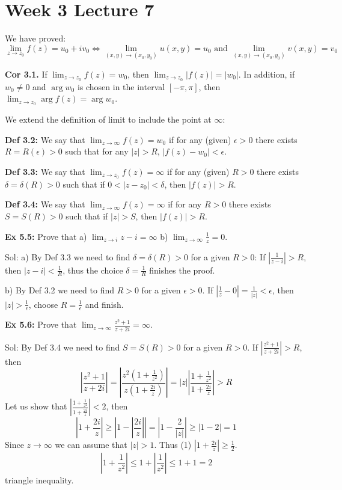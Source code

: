 \documentclass{article}
\begin{document}
\section*{Week 3 Lecture 7}
We have proved:
$$ \lim_{z \to z_0} f(z) = u_0 + iv_0 \iff \lim_{(x,y) \to (x_0, y_0)} u(x,y) = u_0 \text{ and } \lim_{(x,y) \to (x_0, y_0)} v(x,y) = v_0 $$

\textbf{Cor 3.1.} If $\lim_{z \to z_0} f(z) = w_0$, then $\lim_{z \to z_0} |f(z)| = |w_0|$. In addition, if $w_0 \neq 0$ and $\arg w_0$ is chosen in the interval $[-\pi, \pi]$, then $\lim_{z \to z_0} \arg f(z) = \arg w_0$.

We extend the definition of limit to include the point at $\infty$:

\textbf{Def 3.2:} We say that $\lim_{z \to \infty} f(z) = w_0$ if for any (given) $\epsilon > 0$ there exists $R = R(\epsilon) > 0$ such that for any $|z| > R$, $|f(z) - w_0| < \epsilon$.

\textbf{Def 3.3:} We say that $\lim_{z \to z_0} f(z) = \infty$ if for any (given) $R > 0$ there exists $\delta = \delta(R) > 0$ such that if $0 < |z - z_0| < \delta$, then $|f(z)| > R$.

\textbf{Def 3.4:} We say that $\lim_{z \to \infty} f(z) = \infty$ if for any $R > 0$ there exists $S = S(R) > 0$ such that if $|z| > S$, then $|f(z)| > R$.

\textbf{Ex 5.5:} Prove that a) $\lim_{z \to i} z - i = \infty$ b) $\lim_{z \to \infty} \frac{1}{z} = 0$.

Sol: a) By Def 3.3 we need to find $\delta = \delta(R) > 0$ for a given $R > 0$: If $\left|\frac{1}{z-i}\right| > R$, then $|z - i| < \frac{1}{R}$, thus the choice $\delta = \frac{1}{R}$ finishes the proof.

b) By Def 3.2 we need to find $R > 0$ for a given $\epsilon > 0$. If $\left|\frac{1}{z} - 0\right| = \frac{1}{|z|} < \epsilon$, then $|z| > \frac{1}{\epsilon}$, choose $R = \frac{1}{\epsilon}$ and finish.

\textbf{Ex 5.6:} Prove that $\lim_{z \to \infty} \frac{z^2 + 1}{z + 2i} = \infty$.

Sol: By Def 3.4 we need to find $S = S(R) > 0$ for a given $R > 0$. If $\left|\frac{z^2 + 1}{z + 2i}\right| > R$, then
$$ \left|\frac{z^2 + 1}{z + 2i}\right| = \left|\frac{z^2(1 + \frac{1}{z^2})}{z(1 + \frac{2i}{z})}\right| = |z| \left|\frac{1 + \frac{1}{z^2}}{1 + \frac{2i}{z}}\right| > R $$
Let us show that $\left|\frac{1 + \frac{1}{z^2}}{1 + \frac{2i}{z}}\right| < 2$, then
$$ \left|1 + \frac{2i}{z}\right| \geq \left|1 - \left|\frac{2i}{z}\right|\right| = \left|1 - \frac{2}{|z|}\right| \geq \left|1 - 2\right| = 1 $$
Since $z \to \infty$ we can assume that $|z| > 1$. Thus (1) $\left|1 + \frac{2i}{z}\right| \geq \frac{1}{2}$.
$$ \left|1 + \frac{1}{z^2}\right| \leq 1 + \left|\frac{1}{z^2}\right| \leq 1 + 1 = 2 $$
triangle inequality.
\end{document}
